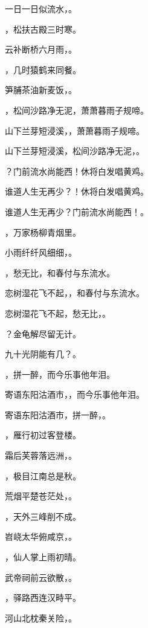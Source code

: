 \documentclass[12pt, a4paper, addpoints, answers]{exam}
\begin{document}
\begin{questions}
\question[3] 一日一日似流水，\fillin 。

\question[3] \fillin ，松扶古殿三时寒。

\question[3] 云补断桥六月雨，\fillin 。

\question[3] \fillin ，几时猿鹤来同餐。

\question[3] 笋脯茶油新麦饭，\fillin 。

\question[3] \fillin ，松间沙路净无泥，萧萧暮雨子规啼。

\question[3] 山下兰芽短浸溪，\fillin ，萧萧暮雨子规啼。

\question[3] 山下兰芽短浸溪，松间沙路净无泥，\fillin 。

\question[3] \fillin ？门前流水尚能西！休将白发唱黄鸡。

\question[3] 谁道人生无再少？\fillin ！休将白发唱黄鸡。

\question[3] 谁道人生无再少？门前流水尚能西！\fillin 。

\question[3] \fillin ，万家杨柳青烟里。

\question[3] 小雨纤纤风细细，\fillin 。

\question[3] \fillin ，愁无比，和春付与东流水。

\question[3] 恋树湿花飞不起，\fillin ，和春付与东流水。

\question[3] 恋树湿花飞不起，愁无比，\fillin 。

\question[3] \fillin ？金龟解尽留无计。

\question[3] 九十光阴能有几？\fillin 。

\question[3] \fillin ，拼一醉，而今乐事他年泪。

\question[3] 寄语东阳沽酒市，\fillin ，而今乐事他年泪。

\question[3] 寄语东阳沽酒市，拼一醉，\fillin 。

\question[3] \fillin ，雁行初过客登楼。

\question[3] 霜后芙蓉落远洲，\fillin 。

\question[3] \fillin ，极目江南总是秋。

\question[3] 荒烟平楚苍茫处，\fillin 。

\question[3] \fillin ，天外三峰削不成。

\question[3] 岧峣太华俯咸京，\fillin 。

\question[3] \fillin ，仙人掌上雨初晴。

\question[3] 武帝祠前云欲散，\fillin 。

\question[3] \fillin ，驿路西连汉畤平。

\question[3] 河山北枕秦关险，\fillin 。


\end{questions}
\end{document}
